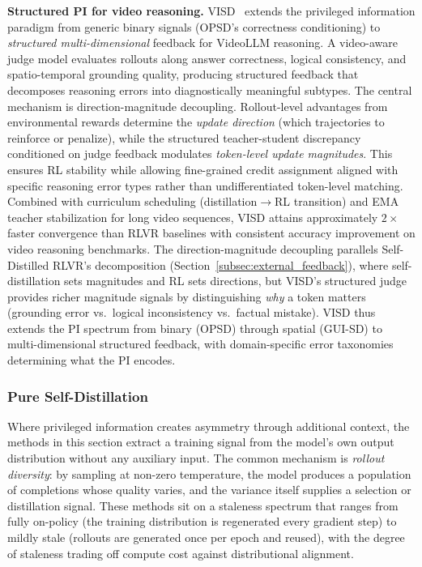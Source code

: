 \documentclass{article} %
\begin{document}
\textbf{Structured PI for video reasoning.} VISD~\citep{2605.06094} extends the privileged information paradigm from generic binary signals (OPSD's correctness conditioning) to \emph{structured multi-dimensional} feedback for VideoLLM reasoning. A video-aware judge model evaluates rollouts along answer correctness, logical consistency, and spatio-temporal grounding quality, producing structured feedback that decomposes reasoning errors into diagnostically meaningful subtypes. The central mechanism is direction-magnitude decoupling. Rollout-level advantages from environmental rewards determine the \emph{update direction} (which trajectories to reinforce or penalize), while the structured teacher-student discrepancy conditioned on judge feedback modulates \emph{token-level update magnitudes}. This ensures RL stability while allowing fine-grained credit assignment aligned with specific reasoning error types rather than undifferentiated token-level matching. Combined with curriculum scheduling (distillation$\to$RL transition) and EMA teacher stabilization for long video sequences, VISD attains approximately $2\times$ faster convergence than RLVR baselines with consistent accuracy improvement on video reasoning benchmarks. The direction-magnitude decoupling parallels Self-Distilled RLVR's decomposition (Section~\ref{subsec:external_feedback}), where self-distillation sets magnitudes and RL sets directions, but VISD's structured judge provides richer magnitude signals by distinguishing \emph{why} a token matters (grounding error vs.\ logical inconsistency vs.\ factual mistake). VISD thus extends the PI spectrum from binary (OPSD) through spatial (GUI-SD) to multi-dimensional structured feedback, with domain-specific error taxonomies determining what the PI encodes.

\subsubsection{Pure Self-Distillation}
\label{subsec:self_play}

Where privileged information creates asymmetry through additional context, the methods in this section extract a training signal from the model's own output distribution without any auxiliary input. The common mechanism is \emph{rollout diversity}: by sampling at non-zero temperature, the model produces a population of completions whose quality varies, and the variance itself supplies a selection or distillation signal. These methods sit on a staleness spectrum that ranges from fully on-policy (the training distribution is regenerated every gradient step) to mildly stale (rollouts are generated once per epoch and reused), with the degree of staleness trading off compute cost against distributional alignment.
\end{document}
